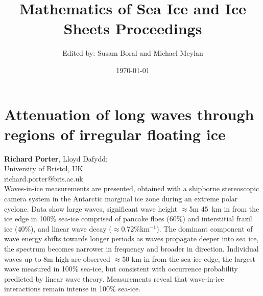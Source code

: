 \documentclass[9pt,a4paper,oneside]{book}
\title{Mathematics of Sea Ice and Ice Sheets  Proceedings}
\author{Edited by: Susam Boral and Michael Meylan}
\date{\today}
\numberwithin{equation}{section}
\begin{document}
 \maketitle

 \tableofcontents
%
%
%
%
%

\newpage


 \section*{Attenuation of long waves through regions of irregular floating ice}
 \label{abs:1}
  {\bf Richard Porter}, Lloyd Dafydd;\\
 University of Bristol, UK\\
 richard.porter@bris.ac.uk\\


Waves-in-ice measurements are presented, obtained with a shipborne stereoscopic camera system in the Antarctic marginal ice zone during an extreme polar cyclone.
Data show large waves, significant wave height $\approx$5m 45 km in from the ice edge in 100\% sea-ice comprised of pancake floes (60\%) and interstitial frazil ice (40\%), and linear wave decay  ($\approx$0.72\%km$^{-1}$).
The dominant component of wave energy shifts towards longer periods as waves propagate deeper into sea ice, the spectrum becomes narrower in frequency and broader in direction.
Individual waves up to 8m high are observed $\approx$50 km in from the sea-ice edge, the largest wave measured in 100\% sea-ice, but consistent with occurrence probability predicted by linear wave theory.
Measurements reveal that wave-in-ice interactions remain intense in 100\% sea-ice.
\end{document}
